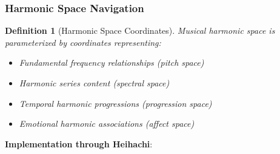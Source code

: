 \documentclass[12pt,a4paper]{article}
\newtheorem{definition}[theorem]{Definition}
\begin{document}
\subsubsection{Harmonic Space Navigation}

\begin{definition}[Harmonic Space Coordinates]
Musical harmonic space is parameterized by coordinates representing:
\begin{itemize}
\item Fundamental frequency relationships (pitch space)
\item Harmonic series content (spectral space)
\item Temporal harmonic progressions (progression space)
\item Emotional harmonic associations (affect space)
\end{itemize}
\end{definition}

\textbf{Implementation through Heihachi}:
\end{document}
